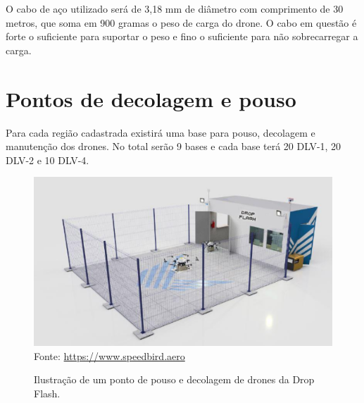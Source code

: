 O cabo de aço utilizado será de 3,18 mm de diâmetro com comprimento de 30 metros, que soma em 900 gramas o peso de carga do drone. O cabo em questão é forte o suficiente para suportar o peso e fino o suficiente para não sobrecarregar a carga.

\section{Pontos de decolagem e pouso}

Para cada região cadastrada existirá uma base para pouso, decolagem e manutenção dos drones. No total serão 9 bases e cada base terá 20 DLV-1, 20 DLV-2 e 10 DLV-4\cite{Speed2024}.

\begin{figure} [!ht]
    \centering
    \caption{Ilustração de um ponto de pouso e decolagem de drones da Drop Flash.}
    \includegraphics[width=0.6\linewidth]{figuras/p dec e po.png}
    \label{fig:enter-label}\\
    \small Fonte: \url{https://www.speedbird.aero}
\end{figure}